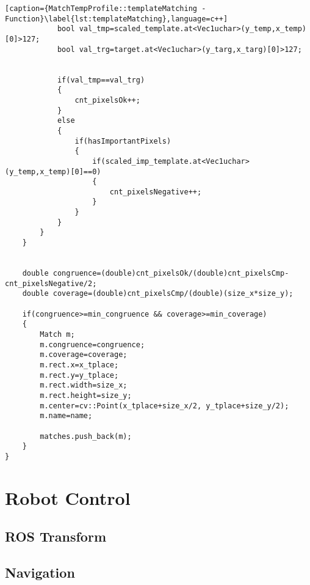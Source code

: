 \begin{lstlisting}[caption={MatchTempProfile::templateMatching - Function}\label{lst:templateMatching},language=c++]
			bool val_tmp=scaled_template.at<Vec1uchar>(y_temp,x_temp)[0]>127;
			bool val_trg=target.at<Vec1uchar>(y_targ,x_targ)[0]>127;


			if(val_tmp==val_trg)
			{
				cnt_pixelsOk++;
			}
			else
			{
				if(hasImportantPixels)
				{
					if(scaled_imp_template.at<Vec1uchar>(y_temp,x_temp)[0]==0)
					{
						cnt_pixelsNegative++;
					}
				}
			}
		}
	}
	

	double congruence=(double)cnt_pixelsOk/(double)cnt_pixelsCmp-cnt_pixelsNegative/2;
	double coverage=(double)cnt_pixelsCmp/(double)(size_x*size_y);

	if(congruence>=min_congruence && coverage>=min_coverage)
	{
		Match m;
		m.congruence=congruence;
		m.coverage=coverage;
		m.rect.x=x_tplace;
		m.rect.y=y_tplace;
		m.rect.width=size_x;
		m.rect.height=size_y;
		m.center=cv::Point(x_tplace+size_x/2, y_tplace+size_y/2);
		m.name=name;

		matches.push_back(m);
	}
}
\end{lstlisting}



\section{Robot Control}
\subsection{ROS Transform}
\subsection{Navigation}
